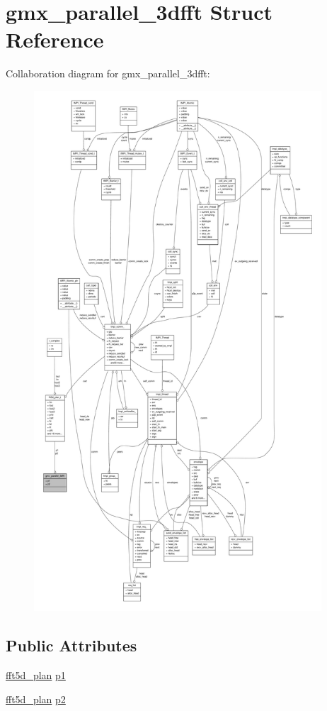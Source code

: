 \hypertarget{structgmx__parallel__3dfft}{\section{gmx\-\_\-parallel\-\_\-3dfft \-Struct \-Reference}
\label{structgmx__parallel__3dfft}
}


\-Collaboration diagram for gmx\-\_\-parallel\-\_\-3dfft\-:
\nopagebreak
\begin{figure}[H]
\begin{center}
\leavevmode
\includegraphics[height=550pt]{structgmx__parallel__3dfft__coll__graph}
\end{center}
\end{figure}
\subsection*{\-Public \-Attributes}
\begin{DoxyCompactItemize}
\item 
\hyperlink{fft5d_8h_aa73d183915f2f81b542a5ef6c0bed083}{fft5d\-\_\-plan} \hyperlink{structgmx__parallel__3dfft_a55ffd6eba20a99e454a94fcf575d2fa8}{p1}
\item 
\hyperlink{fft5d_8h_aa73d183915f2f81b542a5ef6c0bed083}{fft5d\-\_\-plan} \hyperlink{structgmx__parallel__3dfft_ae9f3f1db84b59c7d396e461f78cd6699}{p2}
\end{DoxyCompactItemize}


